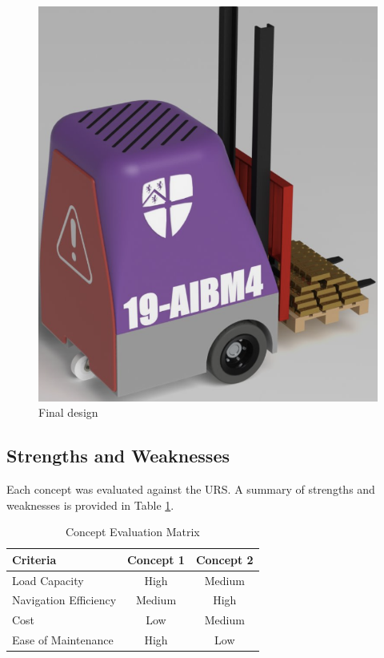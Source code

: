 \documentclass[12pt]{article}
\begin{document}
\begin{enumerate}
\begin{figure}[h!]
\begin{minipage}{0.48\textwidth}
        \includegraphics[width=\textwidth]{finaldesign1.png}
        \caption{Final design}
        \label{fig:final_design}
    \end{minipage}
\end{figure}


\end{enumerate}

\subsection{Strengths and Weaknesses}
Each concept was evaluated against the URS. A summary of strengths and weaknesses is provided in Table \ref{tab:concept_evaluation}.


\begin{table}[h!]
\centering
\caption{Concept Evaluation Matrix}
\begin{tabular}{@{}lcc@{}}
\toprule
\textbf{Criteria}      & \textbf{Concept 1} & \textbf{Concept 2} \\ \midrule
Load Capacity          & High               & Medium             \\
Navigation Efficiency  & Medium             & High               \\
Cost                   & Low                & Medium             \\
Ease of Maintenance    & High               & Low                \\ \bottomrule
\end{tabular}
\label{tab:concept_evaluation}
\end{table}
\end{document}
